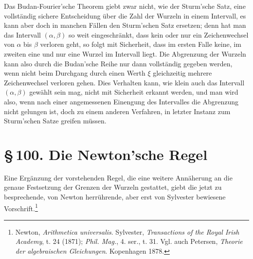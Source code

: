 \documentclass[11pt]{article}
\providecommand{\sect}[2]{\section*{\S\,#1. #2}}
\begin{document}
Das Budan-Fourier'sche Theorem giebt zwar nicht, wie der Sturm'sche Satz, eine vollständig sichere Entscheidung über die Zahl der Wurzeln in einem Intervall, es kann aber doch in manchen Fällen den Sturm'schen Satz ersetzen; denn hat man das Intervall $(\alpha,\beta)$ so weit eingeschränkt, dass kein oder nur ein Zeichenwechsel von $\alpha$ bis $\beta$ verloren geht, so folgt mit Sicherheit, dass im ersten Falle keine, im zweiten eine und nur eine Wurzel im Intervall liegt. Die Abgrenzung der Wurzeln kann also durch die Budan'sche Reihe nur dann vollständig gegeben werden, wenn nicht beim Durchgang durch einen Werth $\xi$ gleichzeitig mehrere Zeichenwechsel verloren gehen. Dies Verhalten kann, wie klein auch das Intervall $(\alpha,\beta)$ gewählt sein mag, nicht mit Sicherheit erkannt werden, und man wird also, wenn nach einer angemessenen Einengung des Intervalles die Abgrenzung nicht gelungen ist, doch zu einem anderen Verfahren, in letzter Instanz zum Sturm'schen Satze greifen müssen.

\sect{100}{Die Newton'sche Regel}

Eine Ergänzung der vorstehenden Regel, die eine weitere Annäherung an die genaue Festsetzung der Grenzen der Wurzeln gestattet, giebt die jetzt zu besprechende, von Newton herrührende, aber erst von Sylvester bewiesene Vorschrift.\footnote{Newton, \emph{Arithmetica universalis}. Sylvester, \emph{Transactions of the Royal Irish Academy}, t. 24 (1871); \emph{Phil. Mag.}, 4. ser., t. 31. Vgl. auch Petersen, \emph{Theorie der algebraischen Gleichungen}. Kopenhagen 1878.}
\end{document}
